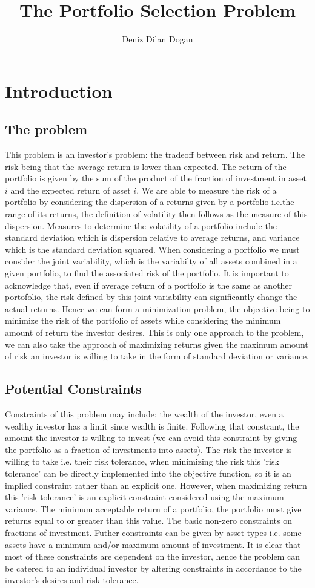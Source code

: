 \documentclass[11pt]{article}
\title{The Portfolio Selection Problem}
\author{Deniz Dilan Dogan}
\begin{document}
	\maketitle
	\tableofcontents
\pagebreak
\section{Introduction}
\subsection{The problem}
This problem is an investor's problem: the tradeoff between risk and return. The risk being that the average return is lower than expected. The return of the portfolio is given by the sum of the product of the fraction of investment in asset $i$ and the expected return of asset $i$. We are able to measure the risk of a portfolio by considering the dispersion of a returns given by a portfolio i.e.the range of its returns, the definition of volatility then follows as the measure of this dispersion. Measures to determine the volatility of a portfolio include the standard deviation which is dispersion relative to average returns, and variance which is the standard deviation squared. When considering a portfolio we must consider the joint variability, which is the variabilty of all assets combined in a given portfolio, to find the associated risk of the portfolio. It is important to acknowledge that, even if average return of a portfolio is the same as another portofolio, the risk defined by this joint variability can significantly change the actual returns. Hence we can form a minimization problem, the objective being to minimize the risk of the portfolio of assets while considering the minimum amount of return the investor desires. This is only one approach to the problem, we can also take the approach of maximizing returns given the maximum amount of risk an investor is willing to take in the form of standard deviation or variance.
\subsection{Potential Constraints}
Constraints of this problem may include: the wealth of the investor, even a wealthy investor has a limit since wealth is finite. Following that constrant, the amount the investor is willing to invest (we can avoid this constraint by giving the portfolio as a fraction of investments into assets). The risk the investor is willing to take i.e. their risk tolerance, when minimizing the risk this 'risk tolerance' can be directly implemented into the objective function, so it is an implied constraint rather than an explicit one. However, when maximizing return this 'risk tolerance' is an explicit constraint considered using the maximum variance. The minimum acceptable return of a portfolio, the portfolio must give returns equal to or greater than this value. The basic non-zero constraints on fractions of investment. Futher constraints can be given by asset types i.e. some assets have a minimum and/or maximum amount of investment. It is clear that most of these constraints are dependent on the investor, hence the problem can be catered to an individual investor by altering constraints in accordance to the investor's desires and risk tolerance.
\end{document}
